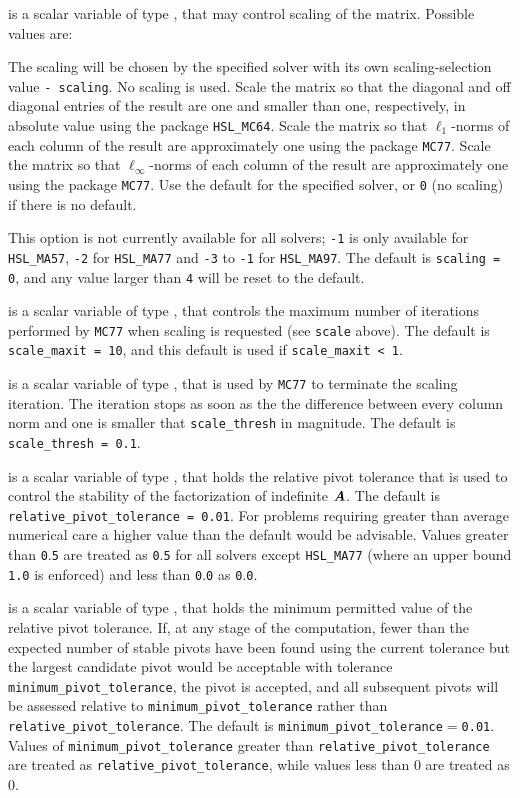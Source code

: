 \documentclass{galahad}
\begin{document}
\begin{description}
 is a scalar variable of type \integer, that may control
scaling of the matrix.
Possible values are:
\begin{description}
 The scaling will be chosen by the specified solver with its
        own scaling-selection value {\tt - scaling}.
 No scaling is used.
 Scale the matrix so that the diagonal and off diagonal
entries of the result are one and smaller than one, respectively,
in absolute value using the package {\tt HSL\_MC64}.
 Scale the matrix so that $\ell_1$-norms of each column
of the result are approximately one using the package {\tt MC77}.
 Scale the matrix so that $\ell_{\infty}$-norms of each column
of the result are approximately one using the package {\tt MC77}.
 Use the default for the specified solver, or {\tt 0} 
(no scaling) if there is no default.
\end{description}
This option is not currently available for all solvers; {\tt -1} is
only available for {\tt HSL\_MA57}, {\tt -2} for {\tt HSL\_MA77}
and {\tt -3} to {\tt -1} for {\tt HSL\_MA97}.
The default is {\tt scaling = 0},
and any value larger than {\tt 4} will be reset to the default.

 is a scalar variable of type \integer,
that controls the maximum number of iterations performed
by {\tt MC77} when scaling is requested (see {\tt scale} above).
The default is {\tt scale\_maxit = 10},
and this default is used if {\tt scale\_maxit < 1}.

 is a scalar variable of type \realdp,
that is used by {\tt MC77} to terminate the scaling iteration.
The iteration stops as soon as the the difference between
every column norm and one is smaller that {\tt scale\_thresh}
in magnitude. The default is {\tt scale\_thresh = 0.1}.

 is a scalar variable of type \realdp,
that holds the relative pivot tolerance that is used to control the
stability of the factorization of indefinite ${\bm{A}}$.
The default is {\tt relative\_pivot\_tolerance = 0.01}.
For problems requiring greater
than average numerical care a higher value than the default would be
advisable. Values greater than {\tt 0}.{\tt 5} are treated as {\tt 0}.{\tt 5}
for all solvers except {\tt HSL\_MA77} (where an upper bound {\tt 1.0} is
enforced) and less than {\tt 0}.{\tt 0} as {\tt 0}.{\tt 0}.

 is a scalar variable of type \realdp,
that holds the minimum permitted value of the relative pivot tolerance.
If, at any stage of the computation, fewer than the
expected number of stable pivots have been found using
the current tolerance but the largest
candidate pivot would be acceptable with tolerance
{\tt minimum\_pivot\_tolerance}, the pivot is accepted, and all
subsequent pivots will be assessed relative to
{\tt minimum\_pivot\_tolerance} rather than
{\tt relative\_pivot\_tolerance}.
The default is {\tt minimum\_pivot\_tolerance$=$0.01}.
Values of {\tt minimum\_pivot\_tolerance} greater than
{\tt relative\_pivot\_\-tolerance} are treated as
{\tt relative\_pivot\_tolerance}, while  values
less than $0$ are treated as $0$.


\end{description}
\end{document}

